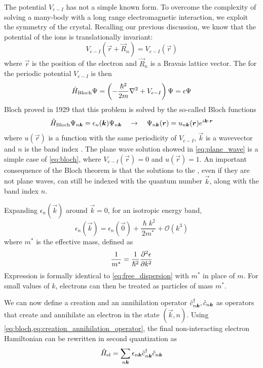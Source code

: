 The potential $V_{e-I}$ has not a simple known form. To overcome the complexity of solving a many-body \sche   with a long range electromagnetic interaction, we exploit the symmetry of the crystal. Recalling our previous discussion, we know that the potential of the ions is translationally invariant:
\begin{equation}
    V_{e-I}(\vec{r}+\vec{R}_n) = V_{e-I}(\vec{r})
\end{equation}
where $\vec{r}$ is the position of the electron and $\vec{R}_n$ is a Bravais lattice vector.
The \sche for the periodic potential $V_{e-I}$ is then
\begin{equation}
    \oper{H}_\text{Bloch} \Psi = \left(-\frac{\hslash^2}{2m} \laplacian + V_{e-I} \right)\Psi = \epsilon\Psi
\end{equation}
Bloch proved in 1929 that this problem is solved by the so-called Bloch functions
\begin{equation}
    \label{eq:bloch}
    \hat{H}_\text{Bloch} \Psi_{n\mathbf{\boldsymbol{k}}} = \epsilon_n(\mathbf{\boldsymbol{k}}) \Psi_{n\mathbf{\boldsymbol{k}}}
    \quad
    \rightarrow
    \quad
    \Psi_{n\mathbf{\boldsymbol{k}}}(\mathbf{\boldsymbol{r}}) = u_{n\mathbf{\boldsymbol{k}}}(\mathbf{\boldsymbol{r}}) e^{i\mathbf{\boldsymbol{k}}\cdot\mathbf{\boldsymbol{r}}}
\end{equation}
where $u(\vec{r})$ is a function with the same periodicity of $V_{e-I}$, $\vec{k}$ is a wavevector and $n$ is the band index \cite{bloch1929}. The plane wave solution showed in \cref{eq:plane_wave} is a simple case of \cref{eq:bloch}, where $V_{e-I}(\vec{r}) = 0$ and $u(\vec{r}) = 1$. An important consequence of the Bloch theorem is that the solutions to the \sche, even if they are not plane waves, can still be indexed with the quantum number $\vec{k}$, along with the band index $n$.

Expanding $\epsilon_n(\vec{k})$ around $\vec{k} = 0$, for an isotropic energy band,
\begin{equation} \label{eq:effective_mass}
    \epsilon_n(\vec{k}) = \epsilon_n(\vec{0}) + \frac{\hslash k^2}{2m^*} + \mathcal{O}(k^3)
\end{equation}
where $m^*$ is the effective mass, defined as
\begin{equation}
    \frac{1}{m^*} = \frac{1}{\hslash^2} \pdv[2]{\epsilon}{k}
\end{equation}
Expression  is formally identical to \cref{eq:free_dispersion} with $m^*$ in place of $m$. For small values of $k$, electrons can then be treated as particles of mass $m^*$.

We can now define a creation and an annihilation operator $\hat{c}^\dagger_{n\mathbf{\boldsymbol{k}}}, \hat{c}_{n\mathbf{\boldsymbol{k}}}$ as operators that create and annihilate an electron in the state $(\vec{k},n)$. Using \cref{eq:bloch,eq:creation_annihilation_operator}, the final non-interacting electron Hamiltonian can be rewritten in second quantization as
\begin{equation}\label{eq:electron_hamiltonian}
    \hat{H}_\text{el} = \sum_{n\mathbf{\boldsymbol{k}}} \epsilon_{n\mathbf{\boldsymbol{k}}} \hat{c}^\dagger_{n\mathbf{\boldsymbol{k}}}\hat{c}_{n\mathbf{\boldsymbol{k}}}
\end{equation}

